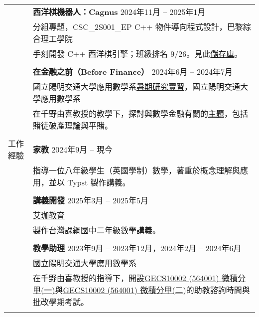 \documentclass[letterpaper, 11pt]{article}
\begin{document}
\begin{CJK*}{UTF8}{bsmi}
\begin{center}
\begin{longtable}{p{0.72in}p{5.97in}}
        & \textbf{西洋棋機器人：Cagnus} \hfill 2024年11月 -- 2025年1月 \\
        & 分組專題，CSC\_2S001\_EP C++ 物件導向程式設計，巴黎綜合理工學院 \\
        & 手刻開發 C++ 西洋棋引擎；班級排名 9/26。見此\href{https://github.com/jetzypetz/chess_bot/blob/main/docs/README.md}{儲存庫}。\\
        & \\

        & \textbf{在金融之前（Before Finance）} \hfill 2024年6月 -- 2024年7月 \\
        & 國立陽明交通大學應用數學系\href{https://teshenglin.github.io/courses/2024_summer_research/}{暑期研究實習}，國立陽明交通大學應用數學系 \\
        & 在千野由喜教授的教學下，探討與數學金融有關的\href{https://hackmd.io/@eiken-sc11/B1QcaW3B0}{主題}，包括賭徒破產理論與平賭。\\
        & \\

        
        {\textcolor{OliveGreen}{工作經驗}} & \textbf{家教} \hfill 2024年9月 -- 現今 \\
        & 指導一位八年級學生（英國學制）數學，著重於概念理解與應用，並以 Typst 製作講義。\\
        & \\

        & \textbf{講義開發} \hfill 2025年3月 -- 2025年5月 \\
        & \href{https://www.instagram.com/aijiatutoring/}{艾珈教育}\\
        & 製作台灣課綱國中二年級數學講義。\\
        & \\
        
        
        & \textbf{教學助理}  \hfill 2023年9月 -- 2023年12月，2024年2月 -- 2024年6月 \\
        & 國立陽明交通大學應用數學系\\
        & 在千野由喜教授的指導下，開設\href{https://timetable.nycu.edu.tw/?r=main/crsoutline&Acy=112&Sem=1&CrsNo=564001&lang=zh-tw}{GECS10002 (564001) 微積分甲(一)}與\href{https://timetable.nycu.edu.tw/?r=main/crsoutline&Acy=112&Sem=2&CrsNo=564001&lang=zh-tw}{GECS10002 (564001) 微積分甲(二)}的助教諮詢時間與批改學期考試。\\
        & \\
        

\end{longtable}
\end{center}
\end{CJK*}
\end{document}
